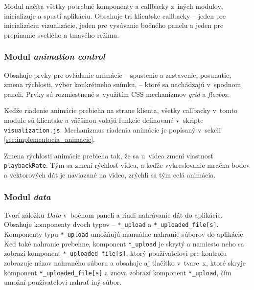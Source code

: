 Modul načíta všetky potrebné komponenty a callbacky z~iných modulov, inicializuje a spustí aplikáciu. Obsahuje tri klientske callbacky -- jeden pre inicializáciu vizualizácie, jeden pre vysúvanie bočného panelu a jeden pre prepínanie svetlého a tmavého režimu.

\subsubsection{Modul \emph{animation control} }

Obsahuje prvky pre ovládanie animácie -- spustenie a zastavenie, posunutie, zmena rýchlosti, výber konkrétneho snímku, -- ktoré sa nachádzajú v~spodnom paneli. Prvky sú rozmiestnené s~využitím CSS mechanizmov \emph{grid} a \emph{flexbox}.

Keďže riadenie animácie prebieha na strane klienta, všetky callbacky v~tomto module sú klientske a väčšinou volajú funkcie definované v~skripte \texttt{visualization.js}. Mechanizmus riadenia animácie je popísaný v~sekcii \ref{sec:implementacia_animacie}.

Zmena rýchlosti animácie prebieha tak, že sa u~videa zmení vlastnosť \texttt{playbackRate}. Tým sa zmení rýchlosť videa, a keďže vykresľovanie mračna bodov a vektorových dát je naviazané na video, zrýchli sa tým celá animácia.

\subsubsection{Modul \emph{data} }

Tvorí záložku \emph{Data} v~bočnom paneli a riadi nahrávanie dát do aplikácie. Obsahuje komponenty dvoch typov -- \texttt{*\_upload} a \texttt{*\_uploaded\_file[s]}. Komponenty typu \texttt{*\_upload} umožňujú manuálne nahranie súborov do aplikácie. Keď také nahranie prebehne, komponent \texttt{*\_upload} je skrytý a namiesto neho sa zobrazí komponent \texttt{*\_uploaded\_file[s]}, ktorý používateľovi pre kontrolu zobrazuje názov nahraného súboru a obsahuje aj tlačítko v~tvare~x, ktoré skryje komponent \texttt{*\_uploaded\_file[s]} a znova zobrazí komponent \texttt{*\_upload}, čím umožní používateľovi nahrať iný súbor.

